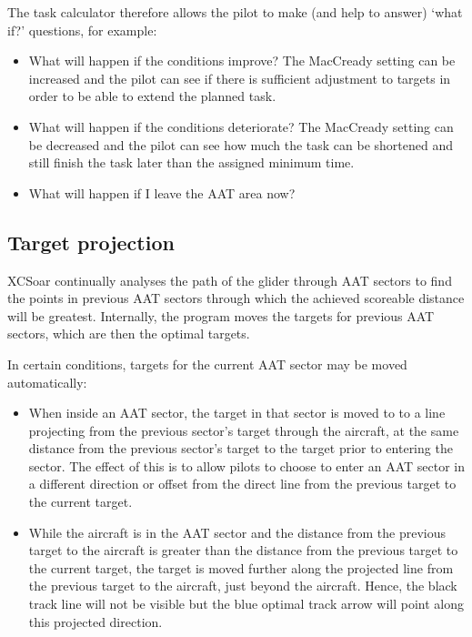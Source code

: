 \documentclass[a4paper,12pt]{refrep}
\begin{document}
The task calculator therefore allows the pilot to make (and help to
answer) `what if?' questions, for example:
\begin{itemize}
\item What will happen if the conditions improve?  The MacCready setting can be 
increased and the pilot can see if there is sufficient adjustment to targets in 
order to be able to extend the planned task.
\item What will happen if the conditions deteriorate?  The MacCready setting can 
be decreased and the pilot can see how much the task can be shortened and still 
finish the task later than the assigned minimum time.
\item What will happen if I leave the AAT area now?
\end{itemize}

\subsection*{Target projection}

XCSoar continually analyses the path of the glider through AAT sectors
to find the points in previous AAT sectors through which the achieved
scoreable distance will be greatest.  Internally, the program moves
the targets for previous AAT sectors, which are then the optimal
targets.

In certain conditions, targets for the current AAT sector may be moved
automatically:
\begin{itemize}
\item When inside an AAT sector, the target in that sector is moved to
to a line projecting from the previous sector's target through the
aircraft, at the same distance from the previous sector's target to
the target prior to entering the sector.  The effect of this is to
allow pilots to choose to enter an AAT sector in a different direction
or offset from the direct line from the previous target to the current
target.

\item While the aircraft is in the AAT sector and the distance from the
previous target to the aircraft is greater than the distance from the
previous target to the current target, the target is moved further
along the projected line from the previous target to the aircraft,
just beyond the aircraft.  Hence, the black track line will not be
visible but the blue optimal track arrow will point along this
projected direction.
\end{itemize}
\end{document}

